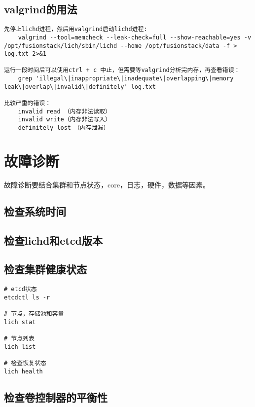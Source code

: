 \subsection{valgrind的用法}

\begin{lstlisting}
先停止lichd进程，然后用valgrind启动lichd进程:
    valgrind --tool=memcheck --leak-check=full --show-reachable=yes -v /opt/fusionstack/lich/sbin/lichd --home /opt/fusionstack/data -f > log.txt 2>&1

运行一段时间后可以使用ctrl + c 中止，但需要等valgrind分析完内存，再查看错误：
    grep 'illegal\|inappropriate\|inadequate\|overlapping\|memory leak\|overlap\|invalid\|definitely' log.txt

比较严重的错误：　　　
    invalid read （内存非法读取）
    invalid write（内存非法写入）
    definitely lost　（内存泄漏）
\end{lstlisting}

\section{故障诊断}

故障诊断要结合集群和节点状态，core，日志，硬件，数据等因素。

\subsection{检查系统时间}

\subsection{检查lichd和etcd版本}

\subsection{检查集群健康状态}

\begin{lstlisting}
# etcd状态
etcdctl ls -r

# 节点，存储池和容量
lich stat

# 节点列表
lich list

# 检查恢复状态
lich health
\end{lstlisting}

\subsection{检查卷控制器的平衡性}

